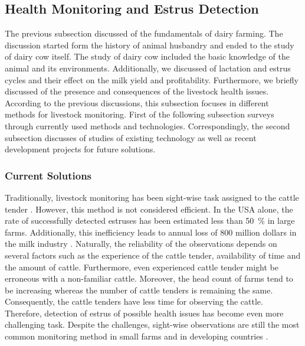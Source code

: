 \documentclass[english,12pt,a4paper,pdftex,elec,utf8]{aaltothesis}
\begin{document}
\subsection{Health Monitoring and Estrus Detection} \label{healthmonitoringandestrusdetectionsection}

The previous subsection discussed of the fundamentals of dairy farming. The discussion started form the history of animal husbandry and ended to the study of dairy cow itself. The study of dairy cow included the basic knowledge of the animal and its environments. Additionally, we discussed of lactation and estrus cycles and their effect on the milk yield and profitability. Furthermore, we briefly discussed of the presence and consequences of the livestock health issues. According to the previous discussions, this subsection focuses in different methods for livestock monitoring. First of the following subsection surveys through currently used methods and technologies. Correspondingly, the second subsection discusses of studies of existing technology as well as recent development projects for future solutions.  

\subsubsection{Current Solutions} \label{currentsolutionssection}

Traditionally, livestock monitoring has been sight-wise task assigned to the cattle tender \cite{lehmahavaintoja}. However, this method is not considered efficient. In the USA alone, the rate of successfully detected estruses has been estimated less than \SI{50}{\percent} in large farms. Additionally, this inefficiency leads to annual loss of 800 million dollars in the milk industry \cite{BRUNASSI2010}. Naturally, the reliability of the observations depends on several factors such as the experience of the cattle tender, availability of time and the amount of cattle. Furthermore, even experienced cattle tender might be erroneous with a non-familiar cattle. Moreover, the head count of farms tend to be increasing whereas the number of cattle tenders is remaining the same. Consequently, the cattle tenders have less time for observing the cattle. Therefore, detection of estrus of possible health issues has become even more challenging task. Despite the challenges, sight-wise observations are still the most common monitoring method in small farms and in developing countries \cite{BRUNASSI2010}. 
\end{document}
